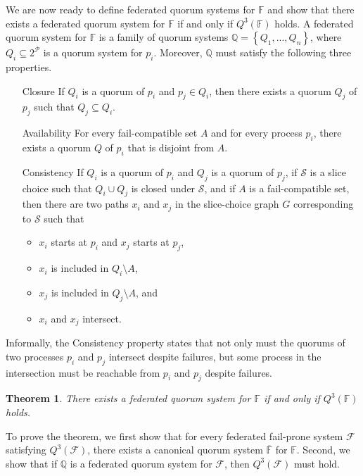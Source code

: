 \documentclass[11pt]{article}
\newtheorem{thm}{Theorem}
\begin{document}
We are now ready to define federated quorum systems for $\mathbb{F}$ and show that there exists a federated quorum system for $\mathbb{F}$ if and only if $Q^3(\mathbb{F})$ holds. A federated quorum system for $\mathbb{F}$ is a family of quorum systems $\mathbb{Q}=\left\{Q_1,...,Q_n\right\}$, where $Q_i\subseteq 2^\mathcal{P}$ is a quorum system for $p_i$. Moreover, $\mathbb{Q}$ must satisfy the following three properties.
\begin{itemize}
  \item [Closure] If $Q_i$ is a quorum of $p_i$ and $p_j\in Q_i$, then there exists a quorum $Q_j$ of $p_j$ such that $Q_j\subseteq Q_i$.
  \item [Availability] For every fail-compatible set $A$ and for every process $p_i$, there exists a quorum $Q$ of $p_i$ that is disjoint from $A$.
  \item[Consistency] If $Q_i$ is a quorum of $p_i$ and $Q_j$ is a quorum of $p_j$, if $\mathcal{S}$ is a slice choice such that $Q_i\cup Q_j$ is closed under $\mathcal{S}$, and if $A$ is a fail-compatible set, then there are two paths $x_i$ and $x_j$ in the slice-choice graph $G$ corresponding to $\mathcal{S}$ such that
    \begin{itemize}
      \item $x_i$ starts at $p_i$ and $x_j$ starts at $p_j$,
      \item $x_i$ is included in $Q_i\setminus A$,
      \item $x_j$ is included in $Q_j\setminus A$, and
      \item $x_i$ and $x_j$ intersect.
    \end{itemize}
\end{itemize}

Informally, the Consistency property states that not only must the quorums of two processes $p_i$ and $p_j$ intersect despite failures, but some process in the intersection must be reachable from $p_i$ and $p_j$ despite failures.

\begin{thm}
  There exists a federated quorum system for $\mathbb{F}$ if and only if $Q^3(\mathbb{F})$ holds.
\end{thm}

To prove the theorem, we first show that for every federated fail-prone system $\mathcal{F}$ satisfying $Q^3(\mathcal{F})$, there exists a canonical quorum system $\overline{\mathbb{F}}$ for $\mathbb{F}$. Second, we show that if $\mathbb{Q}$ is a federated quorum system for $\mathcal{F}$, then $Q^3(\mathcal{F})$ must hold.
\end{document}
